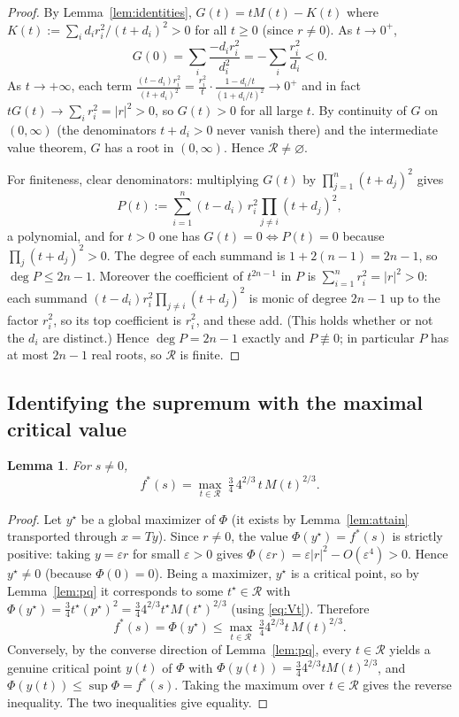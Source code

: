 \documentclass{amsart}
\newtheorem{lemma}{Lemma}
\theoremstyle{definition}
\begin{document}
\begin{proof}
By Lemma~\ref{lem:identities}, $G(t)=tM(t)-K(t)$ where $K(t):=\sum_i d_i r_i^2/(t+d_i)^2>0$ for all $t\ge0$ (since $r\ne0$). As $t\to0^+$,
\[
G(0)=\sum_i\frac{-d_i r_i^2}{d_i^2}=-\sum_i\frac{r_i^2}{d_i}<0 .
\]
As $t\to+\infty$, each term $\frac{(t-d_i)r_i^2}{(t+d_i)^2}=\frac{r_i^2}{t}\cdot\frac{1-d_i/t}{(1+d_i/t)^2}\to0^+$ and in fact $tG(t)\to\sum_i r_i^2=|r|^2>0$, so $G(t)>0$ for all large $t$. By continuity of $G$ on $(0,\infty)$ (the denominators $t+d_i>0$ never vanish there) and the intermediate value theorem, $G$ has a root in $(0,\infty)$. Hence $\mathcal R\ne\varnothing$.

For finiteness, clear denominators: multiplying $G(t)$ by $\prod_{j=1}^n(t+d_j)^2$ gives
\begin{equation}\label{eq:poly}
P(t):=\sum_{i=1}^n (t-d_i)\,r_i^2\prod_{j\ne i}(t+d_j)^2 ,
\end{equation}
a polynomial, and for $t>0$ one has $G(t)=0\iff P(t)=0$ because $\prod_j(t+d_j)^2>0$. The degree of each summand is $1+2(n-1)=2n-1$, so $\deg P\le 2n-1$. Moreover the coefficient of $t^{2n-1}$ in $P$ is $\sum_{i=1}^n r_i^2=|r|^2>0$: each summand $(t-d_i)r_i^2\prod_{j\ne i}(t+d_j)^2$ is monic of degree $2n-1$ up to the factor $r_i^2$, so its top coefficient is $r_i^2$, and these add. (This holds whether or not the $d_i$ are distinct.) Hence $\deg P=2n-1$ exactly and $P\not\equiv0$; in particular $P$ has at most $2n-1$ real roots, so $\mathcal R$ is finite.
\end{proof}

\subsection{Identifying the supremum with the maximal critical value}

\begin{lemma}\label{lem:maxroot}
For $s\ne0$,
\[
f^*(s)=\max_{t\in\mathcal R}\ \tfrac34\,4^{2/3}\,t\,M(t)^{2/3}.
\]
\end{lemma}

\begin{proof}
Let $y^\star$ be a global maximizer of $\Phi$ (it exists by Lemma~\ref{lem:attain} transported through $x=Ty$). Since $r\ne0$, the value $\Phi(y^\star)=f^*(s)$ is strictly positive: taking $y=\varepsilon r$ for small $\varepsilon>0$ gives $\Phi(\varepsilon r)=\varepsilon|r|^2-O(\varepsilon^4)>0$. Hence $y^\star\ne0$ (because $\Phi(0)=0$). Being a maximizer, $y^\star$ is a critical point, so by Lemma~\ref{lem:pq} it corresponds to some $t^\star\in\mathcal R$ with $\Phi(y^\star)=\tfrac34 t^\star (p^\star)^2=\tfrac34 4^{2/3}t^\star M(t^\star)^{2/3}$ (using \eqref{eq:Vt}). Therefore
\[
f^*(s)=\Phi(y^\star)\le \max_{t\in\mathcal R}\ \tfrac34 4^{2/3} t\,M(t)^{2/3}.
\]
Conversely, by the converse direction of Lemma~\ref{lem:pq}, every $t\in\mathcal R$ yields a genuine critical point $y(t)$ of $\Phi$ with $\Phi(y(t))=\tfrac34 4^{2/3} t M(t)^{2/3}$, and $\Phi(y(t))\le\sup\Phi=f^*(s)$. Taking the maximum over $t\in\mathcal R$ gives the reverse inequality. The two inequalities give equality.
\end{proof}
\end{document}
